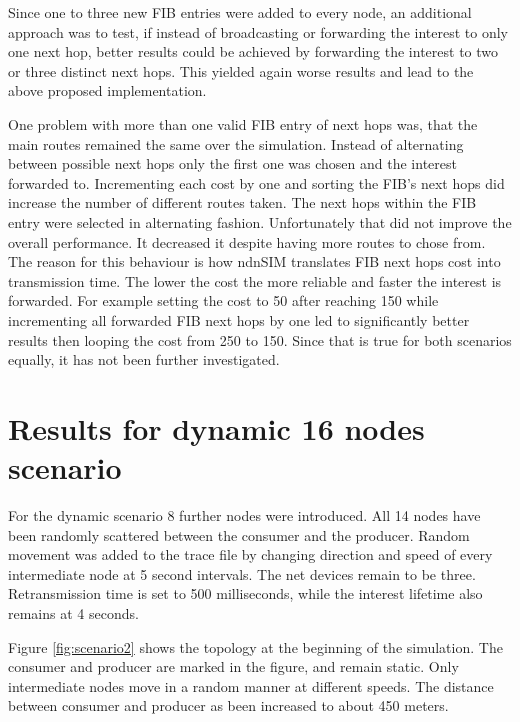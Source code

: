 \vspace{5mm} %

Since one to three new FIB entries were added to every node, an additional approach was to test, if instead of broadcasting or forwarding the interest to only one next hop, better results could be achieved by forwarding the interest to two or three distinct next hops. This yielded again worse results and lead to the above proposed implementation.

\vspace{5mm} %

One problem with more than one valid FIB entry of next hops was, that the main routes remained the same over the simulation. Instead of alternating between possible next hops only the first one was chosen and the interest forwarded to. Incrementing each cost by one and sorting the FIB's next hops did increase the number of different routes taken. The next hops within the FIB entry were selected in alternating fashion. Unfortunately that did not improve the overall performance. It decreased it despite having more routes to chose from. The reason for this behaviour is how ndnSIM translates FIB next hops cost into transmission time. The lower the cost the more reliable and faster the interest is forwarded. For example setting the cost to 50 after reaching 150 while incrementing all forwarded FIB next hops by one led to significantly better results then looping the cost from 250 to 150. Since that is true for both scenarios equally, it has not been further investigated.

\section{Results for dynamic 16 nodes scenario}

For the dynamic scenario 8 further nodes were introduced. All 14 nodes have been randomly scattered between the consumer and the producer. Random movement was added to the trace file by changing direction and speed of every intermediate node at 5 second intervals. The net devices remain to be three. Retransmission time is set to 500 milliseconds, while the interest lifetime also remains at 4 seconds. 

Figure \ref{fig:scenario2} shows the topology at the beginning of the simulation. The consumer and producer are marked in the figure, and remain static. Only intermediate nodes move in a random manner at different speeds. The distance between consumer and producer as been increased to about 450 meters.

